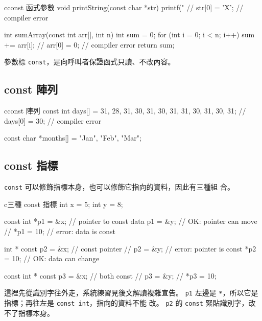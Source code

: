 \begin{code}{c}{const 函式參數}
void printString(const char *str) {
    printf("%
    // str[0] = 'X';   // compiler error
}

int sumArray(const int arr[], int n) {
    int sum = 0;
    for (int i = 0; i < n; i++) {
        sum += arr[i];
    }
    // arr[0] = 0;     // compiler error
    return sum;
}
\end{code}

參數標 \texttt{const}，是向呼叫者保證函式只讀、不改內容。

\subsection{const 陣列}

\begin{code}{c}{const 陣列}
const int days[] = {31, 28, 31, 30, 31, 30, 31, 31, 30, 31, 30, 31};
// days[0] = 30;       // compiler error

const char *months[] = {"Jan", "Feb", "Mar"};
\end{code}

\subsection{const 指標}

\texttt{const} 可以修飾指標本身，也可以修飾它指向的資料，因此有三種組
合。

\begin{code}{c}{三種 const 指標}
int x = 5;
int y = 8;

const int *p1 = &x;    // pointer to const data
p1 = &y;               // OK: pointer can move
// *p1 = 10;           // error: data is const

int * const p2 = &x;   // const pointer
// p2 = &y;            // error: pointer is const
*p2 = 10;              // OK: data can change

const int * const p3 = &x;  // both const
// p3 = &y;
// *p3 = 10;
\end{code}

這裡先從識別字往外走，系統練習見後文解讀複雜宣告。 \texttt{p1} 左邊是
\texttt{*}，所以它是指標；再往左是 \texttt{const int}，指向的資料不能
改。 \texttt{p2} 的 \texttt{const} 緊貼識別字，改不了指標本身。


